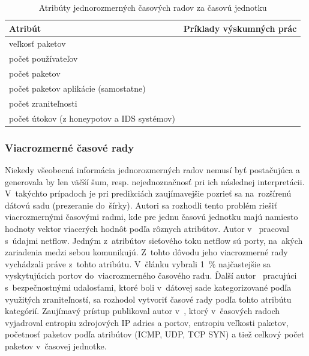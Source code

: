 \documentclass[thesismargins, thesislinespacing, openright, upjsfrontpage]{rnthesis}
\begin{document}
\begin{table}[]
    \centering
    \begin{tabular}{ | p{6cm} | p{8cm} | }
        \hline \textbf{Atribút} & \textbf{Príklady výskumných prác} \\
        \hline
        \hline veľkosť paketov & \cite{jiang2004detecting, wei2012intrusion,madan2018predicting, sang2002predictability,wang2008internet,hasegawa2001applications,cortez2012multi,papagiannaki2005long} \\
        \hline počet používateľov & \cite{jiang2004detecting} \\
        \hline počet paketov & \cite{jiang2004detecting} \\
        \hline počet paketov aplikácie \newline (samostatne) & \cite{jiang2004detecting} \\
        \hline počet zraniteľnosti & \cite{tang2016exploiting,roumani2015time,tang2018disclosure,tang2017big,pokhrel2017cybersecurity,werner2017time} \\
        \hline počet útokov \newline (z honeypotov a IDS systémov) & \cite{fang2019deep,zhan2015predicting,condon2008analysis} \\
        \hline
    \end{tabular}
    \caption{Atribúty jednorozmerných časových radov za časovú jednotku}
    \label{tab:ts_uni}
\end{table}

\subsubsection{Viacrozmerné časové rady}

Niekedy všeobecná informácia jednorozmerných radov nemusí byť postačujúca a generovala by len väčší šum, resp. nejednoznačnosť pri ich následnej interpretácii. V~takýchto prípadoch je pri predikciách zaujímavejšie pozrieť sa na~rozšírenú dátovú sadu (prezeranie do~šírky). Autori \cite{shin2013advanced,ramaki2015real,marchette1999statistical} sa rozhodli tento problém riešiť viacrozmernými časovými radmi, kde pre jednu časovú jednotku majú namiesto hodnoty vektor viacerých hodnôt podľa rôznych atribútov. Autor v~\cite{marchette1999statistical} pracoval s~údajmi netflow. Jedným z~atribútov sieťového toku netflow sú porty, na~akých zariadenia medzi sebou komunikujú. Z~tohto dôvodu jeho viacrozmerné rady vychádzali práve z~tohto atribútu. V~článku vybrali 1~\% najčastejšie sa vyskytujúcich portov do~viacrozmerného časového radu. Ďalší autor~\cite{roumani2015time} pracujúci s~bezpečnostnými udalosťami, ktoré boli v~dátovej sade kategorizované podľa využitých zraniteľností, sa rozhodol vytvoriť časové rady podľa tohto atribútu kategórií. Zaujímavý prístup publikoval autor v~\cite{shin2013advanced}, ktorý v~časových radoch vyjadroval entropiu zdrojových IP adries a portov, entropiu veľkosti paketov, početnosť paketov podľa atribútov (ICMP, UDP, TCP SYN) a tiež celkový počet paketov v~časovej jednotke.
\end{document}
